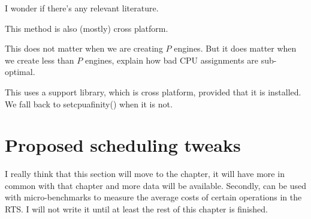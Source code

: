 I wonder if there's any relevant literature.

This method is also (mostly) cross platform.

This does not matter when we are creating $P$ engines.
But it does matter when we create less than $P$ engines,
explain how bad CPU assignments are sub-optimal.

This uses a support library, which is cross platform, provided that it is installed.
We fall back to setcpuafinity() when it is not.


\section{Proposed scheduling tweaks}
\label{sec:proposed_tweaks}

I really think that this section will move to the \tscope chapter,
it will have more in common with that chapter and more data will be
available.
Secondly, \tscope can be used with micro-benchmarks to measure the
average costs of certain operations in the RTS.
I will not write it until at least the rest of this chapter is finished.

%
%

%

%
%

